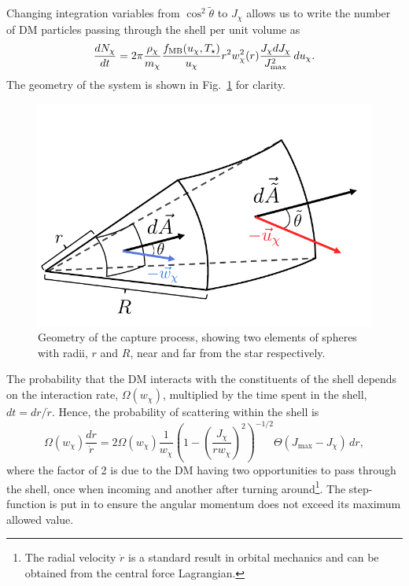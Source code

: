 Changing integration variables from $\cos^2\tilde \theta$ to $J_\chi$ allows us to write the number of DM particles passing through the shell per unit volume as
\begin{equation}
    \frac{dN_\chi}{dt} = 2\pi \frac{\rho_\chi}{m_\chi} \frac{f_{\rm MB}(u_\chi, T_\star)}{u_\chi} r^2 w_\chi^2(r) \frac{J_\chi dJ_\chi}{J^2_\mathrm{max}}\,du_\chi.\label{ch3:eq:shell_flux}
\end{equation}
The geometry of the system is shown in Fig.~\ref{ch3:fig:capturegeometry} for clarity.

\begin{figure}
    \centering
    \includegraphics{capture_geometry.pdf}
    \caption{Geometry of the capture process, showing two elements of spheres with radii, $r$ and $R$, near and far from the star respectively.}
    \label{ch3:fig:capturegeometry}
\end{figure}

The probability that the DM interacts with the constituents of the shell depends on the interaction rate, $\Omega(w_\chi)$, multiplied by the time spent in the shell, $dt = dr/\dot r$. Hence, the probability of scattering within the shell is
\begin{equation}
    \Omega(w_\chi) \frac{dr}{\dot r} = 2  \Omega(w_\chi)\frac{1}{w_\chi}\left(1 - \left(\frac{J_\chi}{r w_\chi}\right)^2 \right)^{-1/2} \Theta(J_{\mathrm{max}} - J_\chi)\,dr,\label{ch3:eq:int_prob_1}
\end{equation}
where the factor of 2 is due to the DM having two opportunities to pass through the shell, once when incoming and another after turning around\footnote{The radial velocity $\dot r$ is a standard result in orbital mechanics and can be obtained from the central force Lagrangian.}. The step-function is put in to ensure the angular momentum does not exceed its maximum allowed value. 

